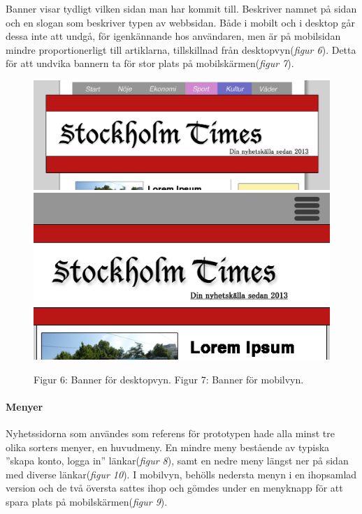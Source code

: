 \documentclass[11pt]{article}
\begin{document}
Banner visar tydligt vilken sidan man har kommit till. Beskriver namnet på sidan och en slogan som beskriver typen av webbsidan. Både i mobilt och i desktop går dessa inte att undgå, för igenkännande hos användaren, men är på mobilsidan mindre proportionerligt till artiklarna, tillskillnad från desktopvyn(\textit{figur 6}). Detta för att undvika bannern ta för stor plats på mobilskärmen(\textit{figur 7}).
\\
\begin{figure}[H]
\centerline{%
\includegraphics[scale=0.258]{pics/bannerdesktop.png}\hspace{2em}%
\includegraphics[scale=0.40]{pics/bannermobil.png}%
}
\vspace{0.3cm}
\hspace{0.15cm}Figur 6: Banner för desktopvyn.\hspace{4.4cm} Figur 7: Banner för mobilvyn.

\end{figure}

\paragraph{Menyer}\mbox{}

Nyhetssidorna som användes som referens för prototypen hade alla minst tre olika sorters menyer, en huvudmeny. En mindre meny bestående av typiska ”skapa konto, logga in” länkar(\textit{figur 8}), samt en nedre meny längst ner på sidan med diverse länkar(\textit{figur 10}). I mobilvyn, behölls nedersta menyn i en ihopsamlad version och de två översta sattes ihop och gömdes under en menyknapp för att spara plats på mobilskärmen(\textit{figur 9}).
\\
\end{document}
